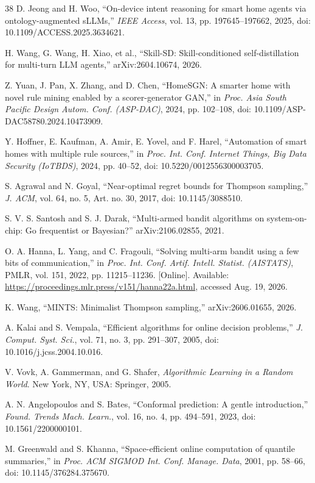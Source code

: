 \documentclass[11pt,a4paper]{article}
\begin{document}
\begin{thebibliography}{38}
 D. Jeong and H. Woo, ``On-device intent reasoning for smart home
agents via ontology-augmented sLLMs,'' \emph{IEEE Access}, vol. 13, pp.
197645--197662, 2025, doi: 10.1109/ACCESS.2025.3634621.

 H. Wang, G. Wang, H. Xiao, et al., ``Skill-SD:
Skill-conditioned self-distillation for multi-turn LLM agents,''
arXiv:2604.10674, 2026.

 Z. Yuan, J. Pan, X. Zhang, and D. Chen, ``HomeSGN: A smarter
home with novel rule mining enabled by a scorer-generator GAN,'' in
\emph{Proc. Asia South Pacific Design Autom. Conf. (ASP-DAC)}, 2024, pp.
102--108, doi: 10.1109/ASP-DAC58780.2024.10473909.

 Y. Hoffner, E. Kaufman, A. Amir, E. Yovel, and F. Harel,
``Automation of smart homes with multiple rule sources,'' in \emph{Proc. Int.
Conf. Internet Things, Big Data Security (IoTBDS)}, 2024, pp. 40--52, doi:
10.5220/0012556300003705.

 S. Agrawal and N. Goyal, ``Near-optimal regret bounds for
Thompson sampling,'' \emph{J. ACM}, vol. 64, no. 5, Art. no. 30, 2017, doi:
10.1145/3088510.

 S. V. S. Santosh and S. J. Darak, ``Multi-armed bandit
algorithms on system-on-chip: Go frequentist or Bayesian?''
arXiv:2106.02855, 2021.

 O. A. Hanna, L. Yang, and C. Fragouli, ``Solving multi-arm
bandit using a few bits of communication,'' in \emph{Proc. Int. Conf. Artif.
Intell. Statist. (AISTATS)}, PMLR, vol. 151, 2022, pp. 11215--11236.
[Online]. Available:
\url{https://proceedings.mlr.press/v151/hanna22a.html}, accessed Aug. 19,
2026.

 K. Wang, ``MINTS: Minimalist Thompson sampling,'' arXiv:2606.01655,
2026.

 A. Kalai and S. Vempala, ``Efficient algorithms for online
decision problems,'' \emph{J. Comput. Syst. Sci.}, vol. 71, no. 3, pp.
291--307, 2005, doi: 10.1016/j.jcss.2004.10.016.

 V. Vovk, A. Gammerman, and G. Shafer, \emph{Algorithmic Learning
in a Random World}. New York, NY, USA: Springer, 2005.

 A. N. Angelopoulos and S. Bates, ``Conformal prediction: A
gentle introduction,'' \emph{Found. Trends Mach. Learn.}, vol. 16, no. 4, pp.
494--591, 2023, doi: 10.1561/2200000101.

 M. Greenwald and S. Khanna, ``Space-efficient online computation
of quantile summaries,'' in \emph{Proc. ACM SIGMOD Int. Conf. Manage. Data},
2001, pp. 58--66, doi: 10.1145/376284.375670.


\end{thebibliography}
\end{document}
